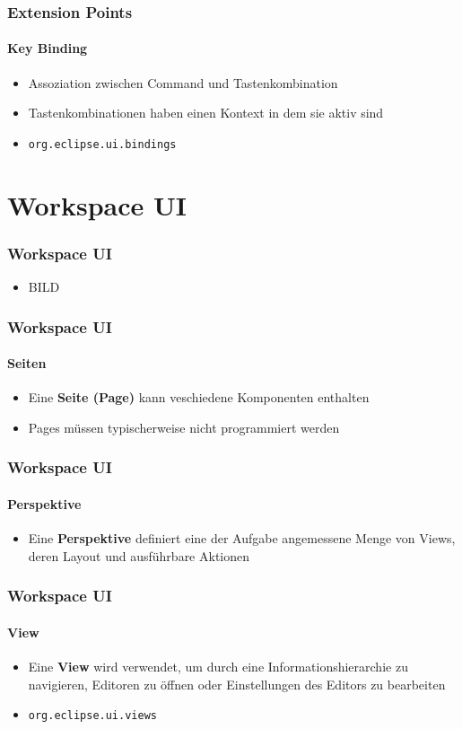 {\begin{frame}
  \frametitle{Extension Points}
  \framesubtitle{Key Binding}
  \begin{itemize}
    \item Assoziation zwischen Command und Tastenkombination
    \item Tastenkombinationen haben einen Kontext in dem sie aktiv sind
    \item \texttt{org.eclipse.ui.bindings}
  \end{itemize}
\end{frame}

\section{Workspace UI}
\begin{frame}
  \frametitle{Workspace UI}
  \begin{itemize}
    \item BILD
  \end{itemize}
\end{frame}

\begin{frame}
  \frametitle{Workspace UI}
  \framesubtitle{Seiten}
  \begin{itemize}
    \item Eine \textbf{Seite (Page)} kann veschiedene Komponenten enthalten
    \item Pages müssen typischerweise nicht programmiert werden
  \end{itemize}
\end{frame}

\begin{frame}
  \frametitle{Workspace UI}
  \framesubtitle{Perspektive}
  \begin{itemize}
    \item Eine \textbf{Perspektive} definiert eine der Aufgabe angemessene Menge von Views, deren Layout und ausführbare Aktionen
  \end{itemize}
\end{frame}

\begin{frame}
  \frametitle{Workspace UI}
  \framesubtitle{View}
  \begin{itemize}
    \item Eine \textbf{View} wird verwendet, um durch eine Informationshierarchie zu navigieren, Editoren zu öffnen oder Einstellungen des Editors zu bearbeiten
    \item \texttt{org.eclipse.ui.views}
  \end{itemize}
\end{frame}

}
